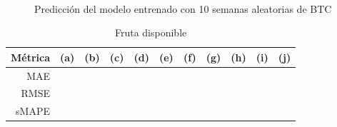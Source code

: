 \documentclass[a4paper,10pt]{article}
\begin{document}
\begin{figure}
    \\
  \caption{Predicción del modelo entrenado con 10 semanas aleatorias de BTC}
  \label{f:ada_wk_arima}
\end{figure}

\begin{table}[t]
 \begin{center}
  \begin{tabular}{|r|c|c|c|c|c|c|c|c|c|c|}
    Métrica & (a) & (b) & (c) & (d) & (e) & (f) & (g) & (h) & (i) & (j) \\ \hline
    MAE &  &  &  &  &  &  &  &  &  &  \\
    RMSE &  &  &  &  &  &  &  &  &  & \\
    sMAPE &  &  &  &  &  &  &  &  &  & \\ \hline
  \end{tabular}
  \caption{Fruta disponible}
  \label{tab:ada}
 \end{center}
\end{table}
\end{document}
